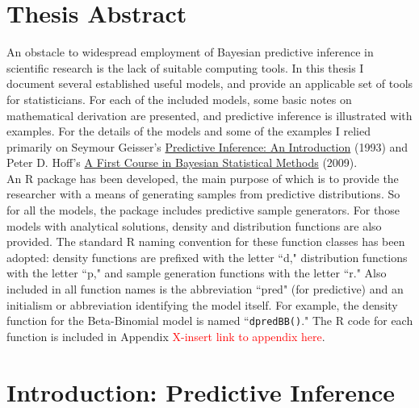 \documentclass[12pt, a4paper]{article}
\begin{document}




\tableofcontents
\listoffigures
\newpage


\section{Thesis Abstract}

An obstacle to widespread employment of Bayesian predictive inference in scientific research is the lack of suitable computing tools.  In this thesis I document several established useful models, and provide an applicable set of tools for statisticians.  For each of the included models, some basic notes on mathematical derivation are presented, and predictive inference is illustrated with examples.  For the details of the models and some of the examples I relied primarily on Seymour Geisser's \underline{Predictive Inference:  An Introduction} (1993) and Peter D. Hoff's \underline{A First Course in Bayesian Statistical Methods} (2009).\\

\noindent An R package has been developed, the main purpose of which is to provide the researcher with a means of generating samples from predictive distributions.  So for all the models, the package includes predictive sample generators.  For those models with analytical solutions, density and distribution functions are also provided.  The standard R naming convention for these function classes has been adopted:  density functions are prefixed with the letter ``d," distribution functions with the letter ``p," and sample generation functions with the letter ``r."  Also included in all function names is the abbreviation ``pred" (for predictive) and an initialism or abbreviation identifying the model itself.  For example, the density function for the Beta-Binomial model is named ``\texttt{dpredBB()}."  The R code for each function is included in Appendix \textcolor{red}{X-insert link to appendix here}.




\section{Introduction:  Predictive Inference}
\end{document}
